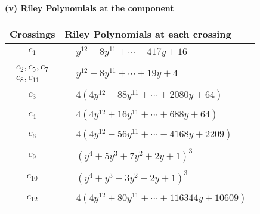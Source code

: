 \documentclass[1p]{elsarticle_modified}
\theoremstyle{definition}
\begin{document}
\newpage\renewcommand{\arraystretch}{1}
\flushleft \textbf{(v) Riley Polynomials at the component}\newline \\
\begin{tabular}{m{50pt}|m{274pt}}
Crossings & \hspace{64pt}Riley Polynomials at each crossing \\
\hline $$\begin{aligned}c_{1}\end{aligned}$$&$\begin{aligned}
&y^{12}-8 y^{11}+\cdots-417 y+16
\end{aligned}$\\
\hline $$\begin{aligned}c_{2},c_{5},c_{7}\\c_{8},c_{11}\end{aligned}$$&$\begin{aligned}
&y^{12}-8 y^{11}+\cdots+19 y+4
\end{aligned}$\\
\hline $$\begin{aligned}c_{3}\end{aligned}$$&$\begin{aligned}
&4(4 y^{12}-88 y^{11}+\cdots+2080 y+64)
\end{aligned}$\\
\hline $$\begin{aligned}c_{4}\end{aligned}$$&$\begin{aligned}
&4(4 y^{12}+16 y^{11}+\cdots+688 y+64)
\end{aligned}$\\
\hline $$\begin{aligned}c_{6}\end{aligned}$$&$\begin{aligned}
&4(4 y^{12}-56 y^{11}+\cdots-4168 y+2209)
\end{aligned}$\\
\hline $$\begin{aligned}c_{9}\end{aligned}$$&$\begin{aligned}
&(y^4+5 y^3+7 y^2+2 y+1)^3
\end{aligned}$\\
\hline $$\begin{aligned}c_{10}\end{aligned}$$&$\begin{aligned}
&(y^4+y^3+3 y^2+2 y+1)^3
\end{aligned}$\\
\hline $$\begin{aligned}c_{12}\end{aligned}$$&$\begin{aligned}
&4(4 y^{12}+80 y^{11}+\cdots+116344 y+10609)
\end{aligned}$\\
\hline
\end{tabular}\\~\\
\end{document}
